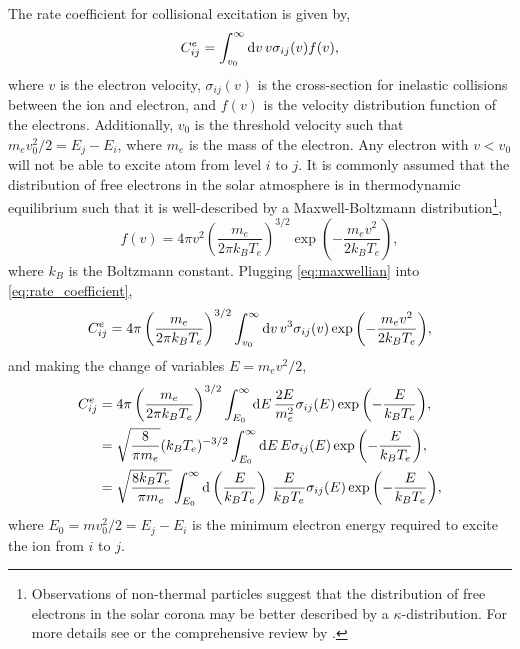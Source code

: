 The rate coefficient for collisional excitation is given by,
\begin{equation}\label{eq:rate_coefficient}
    C^e_{ij} = \int_{v_0}^{\infty}\textup{d}v\,v\sigma_{ij}(v)f(v),
\end{equation}
where $v$ is the electron velocity, $\sigma_{ij}(v)$ is the cross-section for inelastic collisions between the ion and electron, and $f(v)$ is the velocity distribution function of the electrons. Additionally, $v_0$ is the threshold velocity such that $m_ev_0^2/2 = E_j - E_i$, where $m_e$ is the mass of the electron. Any electron with $v<v_0$ will not be able to excite atom from level $i$ to $j$. It is commonly assumed that the distribution of free electrons in the solar atmosphere is in thermodynamic equilibrium such that it is well-described by a Maxwell-Boltzmann distribution\footnote{Observations of non-thermal particles \citep[e.g][]{dzifcakova_diagnostics_2011} suggest that the distribution of free electrons in the solar corona may be better described by a $\kappa$-distribution. For more details see \citet{cranmer_suprathermal_2014} or the comprehensive review by \citet{dudik_nonequilibrium_2017}.},
\begin{equation}\label{eq:maxwellian}
    f(v) = 4\pi v^2 \left(\frac{m_e}{2\pi k_BT_e}\right)^{3/2}\exp{\left(-\frac{m_ev^2}{2k_BT_e}\right)},
\end{equation}
where $k_B$ is the Boltzmann constant. Plugging \autoref{eq:maxwellian} into \autoref{eq:rate_coefficient},
\begin{equation*}
    C^e_{ij} =  4\pi\left(\frac{m_e}{2\pi k_BT_e}\right)^{3/2}\int_{v_0}^{\infty}\textup{d}v\,v^3\sigma_{ij}(v)\exp{\left(-\frac{m_ev^2}{2k_BT_e}\right)},
\end{equation*}
and making the change of variables $E=m_ev^2/2$,
\begin{align}\label{eq:rate_coefficient_e}
    C^e_{ij} &= 4\pi\left(\frac{m_e}{2\pi k_BT_e}\right)^{3/2}\int_{E_0}^{\infty}\textup{d}E\,\frac{2E}{m_e^2}\sigma_{ij}(E)\exp{\left(-\frac{E}{k_BT_e}\right)},\nonumber\\
    &= \sqrt{\frac{8}{\pi m_e}}(k_BT_e)^{-3/2}\int_{E_0}^{\infty}\textup{d}E\,E\sigma_{ij}(E)\exp{\left(-\frac{E}{k_BT_e}\right)},\nonumber\\
    &= \sqrt{\frac{8k_BT_e}{\pi m_e}}\int_{E_0}^{\infty}\textup{d}\left(\frac{E}{k_BT_e}\right)\,\frac{E}{k_BT_e}\sigma_{ij}(E)\exp{\left(-\frac{E}{k_BT_e}\right)},
\end{align}
where $E_0=mv_0^2/2=E_j-E_i$ is the minimum electron energy required to excite the ion from $i$ to $j$.

